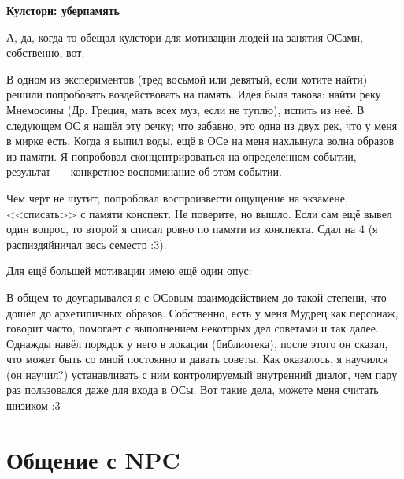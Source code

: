 \documentclass[a4paper,14pt,oneside]{memoir}
\begin{document}
\begin{shaded}

\begin{center}
\Large\textbf{Кулстори: уберпамять}
\end{center}


А, да, когда-то обещал кулстори для мотивации людей на занятия ОСами, собственно, вот.

В одном из экспериментов (тред восьмой или девятый, если хотите найти) решили попробовать воздействовать на память. Идея была такова: найти реку Мнемосины (Др. Греция, мать всех муз, если не туплю), испить из неё. В следующем ОС я нашёл эту речку; что забавно, это одна из двух рек, что у меня в мирке есть. Когда я выпил воды, ещё в ОСе на меня нахлынула волна образов из памяти. Я попробовал сконцентрироваться на определенном событии, результат~--- конкретное воспоминание об этом событии.

Чем черт не шутит, попробовал воспроизвести ощущение на экзамене, <<списать>> с памяти конспект. Не поверите, но вышло. Если сам ещё вывел один вопрос, то второй я списал ровно по памяти из конспекта. Сдал на 4 (я распиздяйничал весь семестр :3).

Для ещё большей мотивации имею ещё один опус:

В общем-то доупарывался я с ОСовым взаимодействием до такой степени, что дошёл до архетипичных образов. Собственно, есть у меня Мудрец как персонаж, говорит часто, помогает с выполнением некоторых дел советами и так далее. Однажды навёл порядок у него в локации (библиотека), после этого он сказал, что может быть со мной постоянно и давать советы. Как оказалось, я научился (он научил?) устанавливать с ним контролируемый внутренний диалог, чем пару раз пользовался даже для входа в ОСы. Вот такие дела, можете меня считать шизиком :3

\end{shaded}

\section{Общение с NPC}

\end{document}
